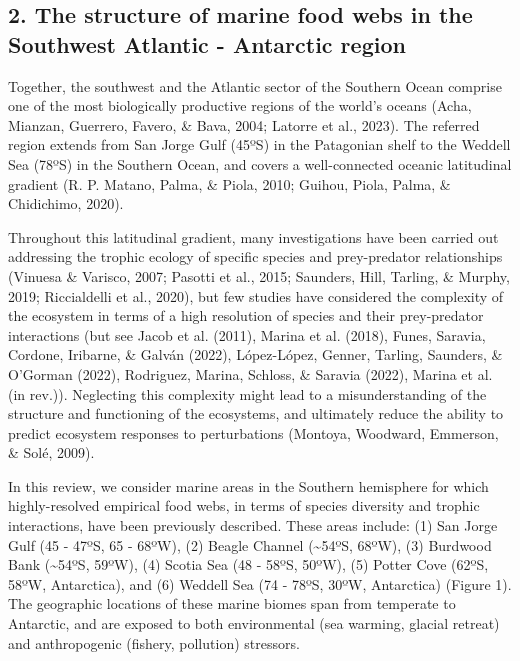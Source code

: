 \documentclass[
]{article}
\begin{document}
\hypertarget{the-structure-of-marine-food-webs-in-the-southwest-atlantic---antarctic-region}{%
\subsection{2. The structure of marine food webs in the Southwest
Atlantic - Antarctic
region}\label{the-structure-of-marine-food-webs-in-the-southwest-atlantic---antarctic-region}}

Together, the southwest and the Atlantic sector of the Southern Ocean
comprise one of the most biologically productive regions of the world's
oceans (Acha, Mianzan, Guerrero, Favero, \& Bava, 2004; Latorre et al.,
2023). The referred region extends from San Jorge Gulf (45ºS) in the
Patagonian shelf to the Weddell Sea (78ºS) in the Southern Ocean, and
covers a well-connected oceanic latitudinal gradient (R. P. Matano,
Palma, \& Piola, 2010; Guihou, Piola, Palma, \& Chidichimo, 2020).

Throughout this latitudinal gradient, many investigations have been
carried out addressing the trophic ecology of specific species and
prey-predator relationships (Vinuesa \& Varisco, 2007; Pasotti et al.,
2015; Saunders, Hill, Tarling, \& Murphy, 2019; Riccialdelli et al.,
2020), but few studies have considered the complexity of the ecosystem
in terms of a high resolution of species and their prey-predator
interactions (but see Jacob et al. (2011), Marina et al. (2018), Funes,
Saravia, Cordone, Iribarne, \& Galván (2022), López-López, Genner,
Tarling, Saunders, \& O'Gorman (2022), Rodriguez, Marina, Schloss, \&
Saravia (2022), Marina et al. (in rev.)). Neglecting this complexity
might lead to a misunderstanding of the structure and functioning of the
ecosystems, and ultimately reduce the ability to predict ecosystem
responses to perturbations (Montoya, Woodward, Emmerson, \& Solé, 2009).

In this review, we consider marine areas in the Southern hemisphere for
which highly-resolved empirical food webs, in terms of species diversity
and trophic interactions, have been previously described. These areas
include: (1) San Jorge Gulf (45 - 47ºS, 65 - 68ºW), (2) Beagle Channel
(\textasciitilde54ºS, 68ºW), (3) Burdwood Bank (\textasciitilde54ºS,
59ºW), (4) Scotia Sea (48 - 58ºS, 50ºW), (5) Potter Cove (62ºS, 58ºW,
Antarctica), and (6) Weddell Sea (74 - 78ºS, 30ºW, Antarctica) (Figure
1). The geographic locations of these marine biomes span from temperate
to Antarctic, and are exposed to both environmental (sea warming,
glacial retreat) and anthropogenic (fishery, pollution) stressors.
\end{document}
